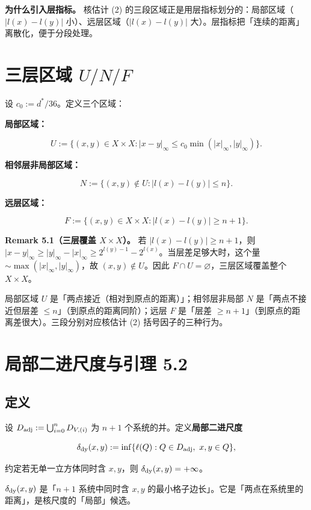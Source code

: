 \documentclass[a4paper,11pt,openany]{ctexbook}
\numberwithin{equation}{chapter}
\numberwithin{figure}{chapter}
\numberwithin{table}{chapter}
\begin{document}
\textbf{为什么引入层指标。} 核估计 (2) 的三段区域正是用层指标划分的：局部区域（$|l(x)-l(y)|$ 小）、远层区域（$|l(x)-l(y)|$ 大）。层指标把「连续的距离」离散化，便于分段处理。

\section{三层区域 $U/N/F$}

设 $c_0:=d^*/36$。定义三个区域：

\textbf{局部区域：}

$$U:=\{(x,y)\in X\times X:|x-y|_\infty\le c_0\min(|x|_\infty,|y|_\infty)\}.$$

\textbf{相邻层非局部区域：}

$$N:=\{(x,y)\notin U:|l(x)-l(y)|\le n\}.$$

\textbf{远层区域：}

$$F:=\{(x,y)\in X\times X:|l(x)-l(y)|\ge n+1\}.$$

\textbf{Remark 5.1（三层覆盖 $X\times X$）。} 若 $|l(x)-l(y)|\ge n+1$，则 $|x-y|_\infty\ge|y|_\infty-|x|_\infty\ge2^{l(y)-1}-2^{l(x)}$。当层差足够大时，这个量 $\sim\max(|x|_\infty,|y|_\infty)$，故 $(x,y)\notin U$。因此 $F\cap U=\varnothing$，三层区域覆盖整个 $X\times X$。

\begin{intuitionbox}
局部区域 $U$ 是「两点接近（相对到原点的距离）」；相邻层非局部 $N$ 是「两点不接近但层差 $\le n$」（到原点的距离同阶）；远层 $F$ 是「层差 $\ge n+1$」（到原点的距离差很大）。三段分别对应核估计 (2) 括号因子的三种行为。
\end{intuitionbox}

\section{局部二进尺度与引理 5.2}

\subsection{定义}

设 $D_{\rm adj}:=\bigcup_{i=0}^n D_{V,(i)}$ 为 $n+1$ 个系统的并。定义\textbf{局部二进尺度}

$$\delta_{\rm dy}(x,y):=\inf\{\ell(Q):Q\in D_{\rm adj},\ x,y\in Q\},$$

约定若无单一立方体同时含 $x,y$，则 $\delta_{\rm dy}(x,y)=+\infty$。

\begin{intuitionbox}
$\delta_{\rm dy}(x,y)$ 是「$n+1$ 系统中同时含 $x,y$ 的最小格子边长」。它是「两点在系统里的距离」，是核尺度的「局部」候选。
\end{intuitionbox}
\end{document}
